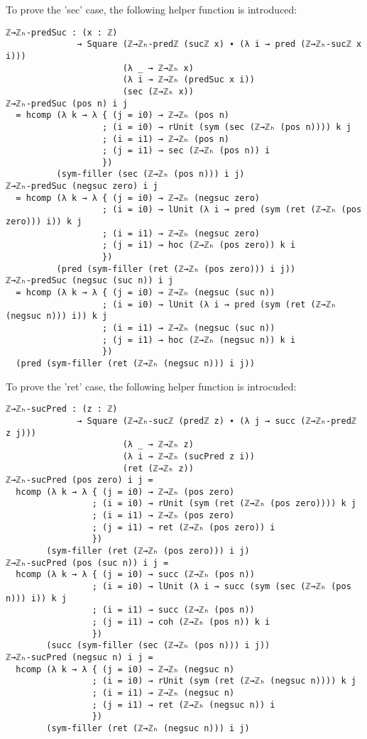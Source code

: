 To prove the 'sec' case, the following helper function is introduced:
\begin{verbatim}
ℤ→ℤₕ-predSuc : (x : ℤ)
              → Square (ℤ→ℤₕ-predℤ (sucℤ x) ∙ (λ i → pred (ℤ→ℤₕ-sucℤ x i)))
                       (λ _ → ℤ→ℤₕ x)
                       (λ i → ℤ→ℤₕ (predSuc x i))
                       (sec (ℤ→ℤₕ x))
ℤ→ℤₕ-predSuc (pos n) i j
  = hcomp (λ k → λ { (j = i0) → ℤ→ℤₕ (pos n)
                   ; (i = i0) → rUnit (sym (sec (ℤ→ℤₕ (pos n)))) k j
                   ; (i = i1) → ℤ→ℤₕ (pos n)
                   ; (j = i1) → sec (ℤ→ℤₕ (pos n)) i
                   })
          (sym-filler (sec (ℤ→ℤₕ (pos n))) i j)
ℤ→ℤₕ-predSuc (negsuc zero) i j
  = hcomp (λ k → λ { (j = i0) → ℤ→ℤₕ (negsuc zero)
                   ; (i = i0) → lUnit (λ i → pred (sym (ret (ℤ→ℤₕ (pos zero))) i)) k j
                   ; (i = i1) → ℤ→ℤₕ (negsuc zero)
                   ; (j = i1) → hoc (ℤ→ℤₕ (pos zero)) k i
                   })
          (pred (sym-filler (ret (ℤ→ℤₕ (pos zero))) i j))
ℤ→ℤₕ-predSuc (negsuc (suc n)) i j
  = hcomp (λ k → λ { (j = i0) → ℤ→ℤₕ (negsuc (suc n))
                   ; (i = i0) → lUnit (λ i → pred (sym (ret (ℤ→ℤₕ (negsuc n))) i)) k j
                   ; (i = i1) → ℤ→ℤₕ (negsuc (suc n))
                   ; (j = i1) → hoc (ℤ→ℤₕ (negsuc n)) k i
                   })
  (pred (sym-filler (ret (ℤ→ℤₕ (negsuc n))) i j))
\end{verbatim}

To prove the 'ret' case, the following helper function is introcuded:
\begin{verbatim}
ℤ→ℤₕ-sucPred : (z : ℤ)
              → Square (ℤ→ℤₕ-sucℤ (predℤ z) ∙ (λ j → succ (ℤ→ℤₕ-predℤ z j)))
                       (λ _ → ℤ→ℤₕ z)
                       (λ i → ℤ→ℤₕ (sucPred z i))
                       (ret (ℤ→ℤₕ z))
ℤ→ℤₕ-sucPred (pos zero) i j =
  hcomp (λ k → λ { (j = i0) → ℤ→ℤₕ (pos zero)
                 ; (i = i0) → rUnit (sym (ret (ℤ→ℤₕ (pos zero)))) k j
                 ; (i = i1) → ℤ→ℤₕ (pos zero)
                 ; (j = i1) → ret (ℤ→ℤₕ (pos zero)) i
                 })
        (sym-filler (ret (ℤ→ℤₕ (pos zero))) i j)
ℤ→ℤₕ-sucPred (pos (suc n)) i j =
  hcomp (λ k → λ { (j = i0) → succ (ℤ→ℤₕ (pos n))
                 ; (i = i0) → lUnit (λ i → succ (sym (sec (ℤ→ℤₕ (pos n))) i)) k j
                 ; (i = i1) → succ (ℤ→ℤₕ (pos n))
                 ; (j = i1) → coh (ℤ→ℤₕ (pos n)) k i
                 })
        (succ (sym-filler (sec (ℤ→ℤₕ (pos n))) i j))
ℤ→ℤₕ-sucPred (negsuc n) i j =
  hcomp (λ k → λ { (j = i0) → ℤ→ℤₕ (negsuc n)
                 ; (i = i0) → rUnit (sym (ret (ℤ→ℤₕ (negsuc n)))) k j
                 ; (i = i1) → ℤ→ℤₕ (negsuc n)
                 ; (j = i1) → ret (ℤ→ℤₕ (negsuc n)) i
                 })
        (sym-filler (ret (ℤ→ℤₕ (negsuc n))) i j)
\end{verbatim}

